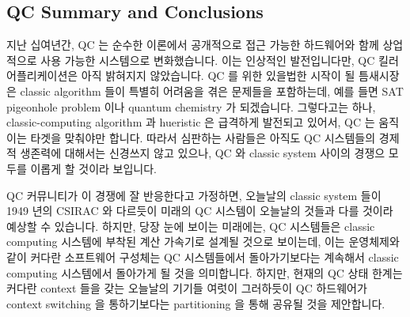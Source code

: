 \subsection{QC Summary and Conclusions}
\label{sec:future:QC Summary and Conclusions}

지난 십여년간, QC 는 순수한 이론에서 공개적으로 접근 가능한 하드웨어와 함께
상업적으로 사용 가능한 시스템으로 변화했습니다.
이는 인상적인 발전입니다만, QC 킬러 어플리케이션은 아직 밝혀지지 않았습니다.
QC 를 위한 있을법한 시작이 될 틈새시장은 classic algorithm 들이 특별히 어려움을
겪은 문제들을 포함하는데, 예를 들면 SAT pigeonhole problem 이나 quantum
chemistry 가 되겠습니다.  그렇다고는 하나, classic-computing algorithm 과
hueristic 은 급격하게 발전되고 있어서, QC 는 움직이는 타겟을 맞춰야만 합니다.
따라서 심판하는 사람들은 아직도 QC 시스템들의 경제적 생존력에 대해서는 신경쓰지
않고 있으나, QC 와 classic system 사이의 경쟁으 모두를 이롭게 할 것이라
보입니다.

QC 커뮤니티가 이 경쟁에 잘 반응한다고 가정하면, 오늘날의 classic system 들이
1949 년의 CSIRAC 와 다르듯이 미래의 QC 시스템이 오늘날의 것들과 다를 것이라
예상할 수 있습니다.
하지만, 당장 눈에 보이는 미래에는, QC 시스템들은 classic computing 시스템에
부착된 계산 가속기로 설계될 것으로 보이는데, 이는 운영체제와 같이 커다란
소프트웨어 구성체는 QC 시스템들에서 돌아가기보다는 계속해서 classic computing
시스템에서 돌아가게 될 것을 의미합니다.
하지만, 현재의 QC 상태 한계는 커다란 context 들을 갖는 오늘날의 기기들 여럿이
그러하듯이 QC 하드웨어가 context switching 을 통하기보다는 partitioning 을 통해
공유될 것을 제안합니다.

